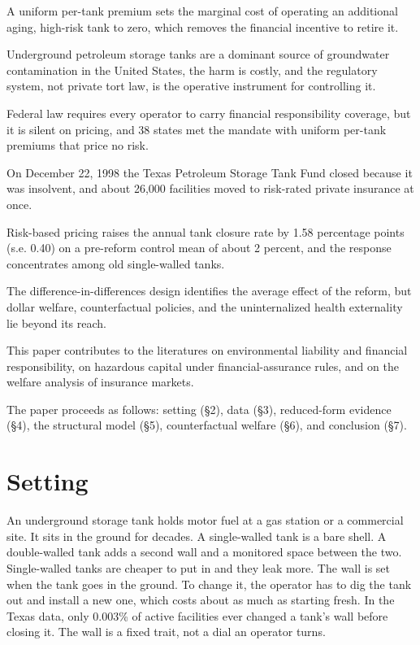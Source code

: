 \documentclass[
  12pt,
]{article}
\begin{document}
A uniform per-tank premium sets the marginal cost of operating an
additional aging, high-risk tank to zero, which removes the financial
incentive to retire it.

Underground petroleum storage tanks are a dominant source of groundwater
contamination in the United States, the harm is costly, and the
regulatory system, not private tort law, is the operative instrument for
controlling it.

Federal law requires every operator to carry financial responsibility
coverage, but it is silent on pricing, and 38 states met the mandate
with uniform per-tank premiums that price no risk.

On December 22, 1998 the Texas Petroleum Storage Tank Fund closed
because it was insolvent, and about 26,000 facilities moved to
risk-rated private insurance at once.

Risk-based pricing raises the annual tank closure rate by 1.58
percentage points (s.e. 0.40) on a pre-reform control mean of about 2
percent, and the response concentrates among old single-walled tanks.

The difference-in-differences design identifies the average effect of
the reform, but dollar welfare, counterfactual policies, and the
uninternalized health externality lie beyond its reach.

This paper contributes to the literatures on environmental liability and
financial responsibility, on hazardous capital under financial-assurance
rules, and on the welfare analysis of insurance markets.

The paper proceeds as follows: setting (§2), data (§3), reduced-form
evidence (§4), the structural model (§5), counterfactual welfare (§6),
and conclusion (§7).

\section{Setting}\label{setting}

An underground storage tank holds motor fuel at a gas station or a
commercial site. It sits in the ground for decades. A single-walled tank
is a bare shell. A double-walled tank adds a second wall and a monitored
space between the two. Single-walled tanks are cheaper to put in and
they leak more. The wall is set when the tank goes in the ground. To
change it, the operator has to dig the tank out and install a new one,
which costs about as much as starting fresh. In the Texas data, only
0.003\% of active facilities ever changed a tank's wall before closing
it. The wall is a fixed trait, not a dial an operator turns.
\end{document}
